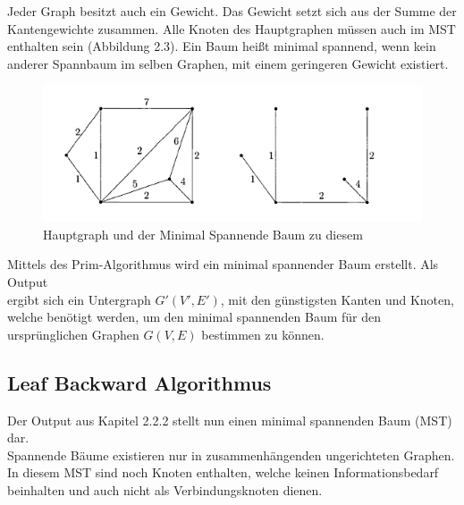 Jeder Graph besitzt auch ein Gewicht. Das Gewicht setzt sich aus der Summe der
Kantengewichte zusammen.  Alle Knoten des Hauptgraphen müssen auch im MST enthalten sein (Abbildung 2.3). 
Ein Baum heißt minimal spannend, wenn kein anderer Spannbaum im selben Graphen, mit einem geringeren Gewicht existiert\cite{krumke1}.

\begin{figure}[H]
    \centerline{\includegraphics[scale=0.5]{pics/minimal_spannender_baum}}
    \caption[Minimal Spannender Baum-MST]{\label{FiG:Minimal Spannender Baum }
	Hauptgraph\cite{krumke1} und der Minimal Spannende Baum zu diesem \cite{krumke1}}
\end{figure}	

\par Mittels des Prim-Algorithmus wird ein minimal spannender Baum erstellt. 
Als Output\\ergibt sich ein Untergraph  $G'(V',E')$, mit den günstigsten Kanten und Knoten, welche benötigt werden, um den minimal spannenden Baum für den 
ursprünglichen Graphen $G(V,E)$ bestimmen zu können\cite{krumke1}.

\vspace{1cm}

\subsection{Leaf Backward Algorithmus}
\label{sec2:methoden}


\vspace{0.5cm}

Der Output aus Kapitel 2.2.2 stellt nun einen minimal spannenden Baum (MST) dar.\\ Spannende Bäume existieren nur in zusammenhängenden ungerichteten
Graphen.\\
In diesem MST sind noch Knoten enthalten, welche keinen Informationsbedarf
beinhalten und auch nicht als Verbindungsknoten dienen.

\vspace{0.3cm}


